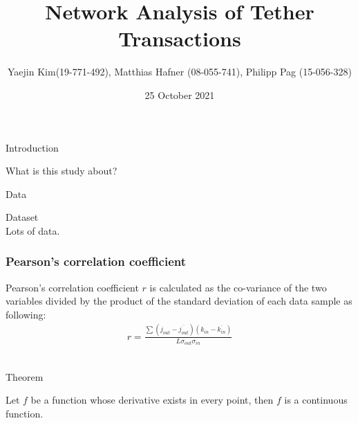 \documentclass{beamer}
\title{Network Analysis of Tether Transactions}
\author{\small{Yaejin Kim(19-771-492), Matthias Hafner (08-055-741), Philipp Pag (15-056-328)}}
\institute[University of Zürich]
\date{25 October 2021}
\begin{document}
\begin{frame}
\titlepage %
\end{frame}


\begin{frame}{Introduction}

What is this study about?\\
   

     
\end{frame}


\begin{frame}{Data}

Dataset\\

Lots of data.


\end{frame}


\begin{frame}

\frametitle{Pearson's correlation coefficient}

Pearson's correlation coefficient $r$ is calculated as the co-variance of the two variables divided by the product of the standard deviation of each data sample as following:
\begin{equation*}
	\begin{split}
		r = \frac{\sum(j_{out}-\overline{{j}_{out}})(k_{in}-\overline{{k}_{in}})}{L \sigma_{out}\sigma_{in}}
	\end{split}
\end{equation*}\\

\end{frame}


\begin{frame}{Theorem}

\begin{theorem}
Let \(f\) be a function whose derivative exists in every point, then \(f\) 
is a continuous function.
\end{theorem}


\end{frame}

\end{document}
